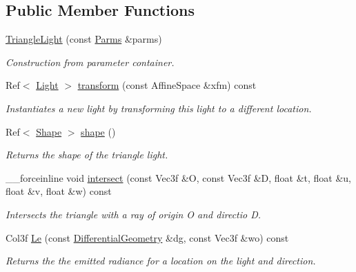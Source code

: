 \subsection*{Public Member Functions}
\begin{DoxyCompactItemize}
\item 
\hyperlink{classembree_1_1_triangle_light_a9ba8605d1533d7b44b65638115f7ed85}{TriangleLight} (const \hyperlink{classembree_1_1_parms}{Parms} \&parms)
\begin{DoxyCompactList}\small\item\em Construction from parameter container. \item\end{DoxyCompactList}\item 
Ref$<$ \hyperlink{classembree_1_1_light}{Light} $>$ \hyperlink{classembree_1_1_triangle_light_a5f232bd6f2f5220af56acf02807250b9}{transform} (const AffineSpace \&xfm) const 
\begin{DoxyCompactList}\small\item\em Instantiates a new light by transforming this light to a different location. \item\end{DoxyCompactList}\item 
Ref$<$ \hyperlink{classembree_1_1_shape}{Shape} $>$ \hyperlink{classembree_1_1_triangle_light_a82dc022211dba8b809f0526ad71eccf4}{shape} ()
\begin{DoxyCompactList}\small\item\em Returns the shape of the triangle light. \item\end{DoxyCompactList}\item 
\_\-\_\-forceinline void \hyperlink{classembree_1_1_triangle_light_a25afe449f2064af19858a481f520bebb}{intersect} (const Vec3f \&O, const Vec3f \&D, float \&t, float \&u, float \&v, float \&w) const 
\begin{DoxyCompactList}\small\item\em Intersects the triangle with a ray of origin O and directio D. \item\end{DoxyCompactList}\item 
Col3f \hyperlink{classembree_1_1_triangle_light_ae70fea93eb5774f352f856805f072313}{Le} (const \hyperlink{structembree_1_1_differential_geometry}{DifferentialGeometry} \&dg, const Vec3f \&wo) const 
\begin{DoxyCompactList}\small\item\em Returns the the emitted radiance for a location on the light and direction. \item\end{DoxyCompactList}\item 

\end{DoxyCompactItemize}
